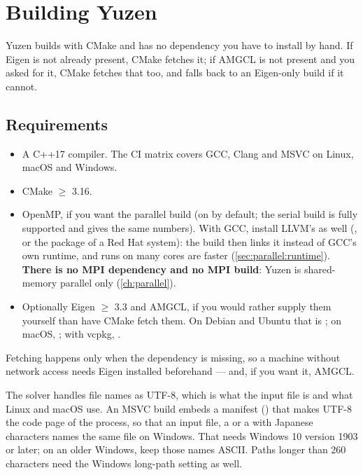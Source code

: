 \chapter{Building Yuzen}
\label{ch:installation}

Yuzen builds with CMake and has no dependency you have to install by hand. If
Eigen is not already present, CMake fetches it; if AMGCL is not present and you
asked for it, CMake fetches that too, and falls back to an Eigen-only build if
it cannot.

\section{Requirements}
\label{sec:install:requirements}

\begin{itemize}
  \item A C++17 compiler. The CI matrix covers GCC, Clang and MSVC on Linux,
        macOS and Windows.
  \item CMake $\ge$ 3.16.
  \item OpenMP, if you want the parallel build (on by default; the serial build
        is fully supported and gives the same numbers). With GCC, install
        LLVM's  as well (, or the
         package of a Red Hat system): the build then links it
        instead of GCC's own runtime, and runs on many cores are faster
        (\cref{sec:parallel:runtime}). \textbf{There is no MPI
        dependency and no MPI build}: Yuzen is shared-memory parallel only
        (\cref{ch:parallel}).
  \item Optionally Eigen $\ge$ 3.3 and AMGCL, if you would rather supply them
        yourself than have CMake fetch them. On Debian and Ubuntu that is
        ; on macOS, ;
        with vcpkg, .
\end{itemize}

Fetching happens only when the dependency is missing, so a machine without
network access needs Eigen installed beforehand --- and, if you want it, AMGCL.

\begin{note}
  The solver handles file names as UTF-8, which is what the input file is
  and what Linux and macOS use. An MSVC build embeds a manifest
  () that makes UTF-8 the code page of the
  process, so that an input file, a  or a
   with Japanese characters names the same file on
  Windows. That needs Windows 10 version 1903 or later; on an older Windows,
  keep those names ASCII. Paths longer than 260 characters need the Windows
  long-path setting as well.
\end{note}

